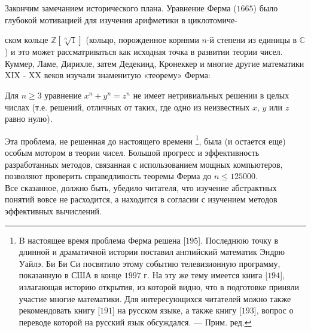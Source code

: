\documentclass{mai_book}
\begin{document}
Закончим замечанием исторического плана. Уравнение Ферма ($1665$)
было глубокой мотивацией для изучения арифметики в циклотомиче-

\noindent ском кольце $\mathbb{Z}[\sqrt[n]1]$ (кольцо, порожденное корнями $n$-й степени из единицы в $\mathbb{C}$) и это может рассматриваться как исходная точка в развитии теории чисел. Куммер, Ламе, Дирихле, затем Дедекинд, Кронеккер и многие другие математики XIX - XX веков изучали знаменитую «теорему» Ферма:
\\

\begin{thm}
Для $n \ge 3$ уравнение $x^n + y^n = z^n$ не имеет нетривиальных 
решении в целых числах (т.е. решений, отличных от таких, где одно из
неизвестных $x$, $y$ или $z$ равно нулю).
\end{thm}

Эта проблема, не решенная до настоящего времени \footnote{B настоящее время проблема Ферма решена [$195$]. Последнюю точку в длинной
и драматичной истории поставил английский математик Эндрю Уайлэ. Би Би Си
посвятило этому событию телевизионную программу, показанную в США в конце
$1997$ г. На эту же тему имеется книга [$194$], излагающая историю открытия, из которой видно, что в подготовке приняли участие многие математики. Для 
интересующихся читателей можно также рекомендовать книгу [$191$] на русском языке, а также книгу [$193$], вопрос о переводе которой на русский язык обсуждался. — Прим. ред.}, была (и 
остается еще) особым мотором в теории чисел. Большой прогресс и 
эффективность разработанных методов, связанная с использованием мощных
компьютеров, позволяют проверить справедливость теоремы Ферма до
$n \le 125000$.
\\

Все сказанное, должно быть, убедило читателя, что изучение
абстрактных понятий вовсе не расходится, а находится в согласии с
изучением методов эффективных вычислений.
\\

\newpage
\end{document}
